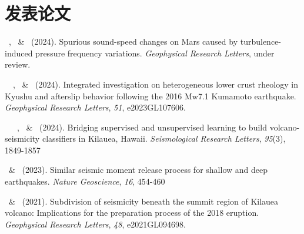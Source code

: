 \section{发表论文}
\newcommand{\Revision}{\emph{正在审稿}}
\newcommand{\CS}{*} %
\begin{etaremune}
    \item \Me\, \ZLi\CS, \XHan\ \& \RYuan\ (2024).
        Spurious sound-speed changes on Mars caused by turbulence-induced pressure frequency variations.
        \emph{Geophysical Research Letters}, under review.
    \item \YLiu\, \Me\, \YHu\CS, \JZhang\ \& \YChen\ (2024).
       Integrated investigation on heterogeneous lower crust rheology in Kyushu and afterslip behavior following the 2016 Mw7.1 Kumamoto earthquake.
        \emph{Geophysical Research Letters}, \emph{51}, e2023GL107606.
    \item \Me\, \YHu\, \SMa\, \ZLi\CS, \GLiu\ \& \HHuang\ (2024).
        Bridging supervised and unsupervised learning to build volcano-seismicity classifiers in Kilauea, Hawaii.
        \emph{Seismological Research Letters}, \emph{95}(3), 1849-1857
    \item \Me\, \ZLi\CS \& \YHu\ (2023).
        Similar seismic moment release process for shallow and deep earthquakes.
        \emph{Nature Geoscience}, \emph{16}, 454-460
    \item \Me\, \ZLi\CS \& \HHuang\ (2021).
        Subdivision of seismicity beneath the summit region of Kilauea volcano: Implications for the preparation process of the 2018 eruption.
        \emph{Geophysical Research Letters}, \emph{48}, e2021GL094698.
    \end{etaremune}
